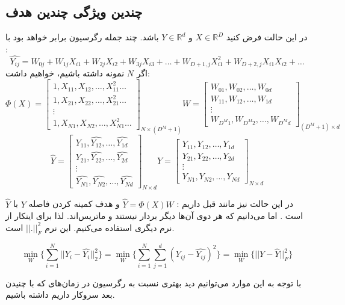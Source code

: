 \documentclass[a4paper, 12pt]{article}
\begin{document}
\subsection*{چندین ویژگی چندین هدف}
در این حالت فرض کنید 
$X\in \mathbb{R}^D$
و
$Y \in \mathbb{R}^d$
باشد. چند جمله رگرسیون برابر خواهد بود با :
\[
\hat{Y_{ij}} = W_{0j} + W_{1j}X_{i1} + W_{2j}X_{i2} + W_{3j} X_{i3} + \dots + W_{D+1,j} X_{i1}^2 + W_{D+2,j}X_{i1}X_{i2} + \dots
\]
اگر 
$N$
نمونه داشته باشیم، خواهیم داشت:
\[
\Phi(X) = \begin{bmatrix}
	1,X_{11},X_{12},\dots,X_{11}^2\dots\\
	1,X_{21},X_{22},\dots,X_{21}^2\dots \\
	\vdots\\
	1,X_{N1},X_{N2},\dots,X_{N1}^2\dots
\end{bmatrix}_{N\times (D^M+1)}
W = \begin{bmatrix}
	W_{01},W_{02},\dots,W_{0d}\\
	W_{11},W_{12},\dots,W_{1d}\\\vdots\\
	W_{D^M1},W_{D^M2},\dots,W_{D^Md}
\end{bmatrix}_{(D^M + 1) \times d}
\]\[
\hat{Y} = \begin{bmatrix}
	\hat{Y_{11}},\hat{Y_{12}},\dots,\hat{Y_{1d}}\\
	\hat{Y_{21}},\hat{Y_{22}},\dots,\hat{Y_{2d}}\\\vdots\\
	\hat{Y_{N1}},\hat{Y_{N2}},\dots,\hat{Y_{Nd}}
\end{bmatrix}_{N\times d}
Y = \begin{bmatrix}
	Y_{11},Y_{12},\dots,Y_{1d}\\
	Y_{21},Y_{22},\dots,Y_{2d}\\\vdots\\
	Y_{N1},Y_{N2},\dots,Y_{Nd}
\end{bmatrix}_{N\times d}
\]

در این حالت نیز مانند قبل داریم :
$\hat{Y} = \Phi(X)W$
و هدف کمینه کردن فاصله 
$Y$
با 
$\hat{Y}$
است . اما می‌دانیم که هر دوی آن‌ها دیگر بردار نیستند و ماتریس‌اند. لذا برای اینکار از نرم دیگری استفاده می‌کنیم. این نرم
$||.||_F^2$
است.

\[
\min_W \{\sum\limits_{i=1}^{N}||Y_i - \hat{Y_i}||_2^2\} = \min_W \{\sum\limits_{i=1}^{N}\sum\limits_{j=1}^{d}(Y_{ij} - \hat{Y_{ij}})^2\} = \min_W \{|| Y - \hat{Y} ||_F^2\}
\]

با توجه به این موارد می‌توانیم دید بهتری نسبت به رگرسیون در زمان‌های که با چنیدن بعد سروکار داریم داشته باشیم. 
\end{document}
